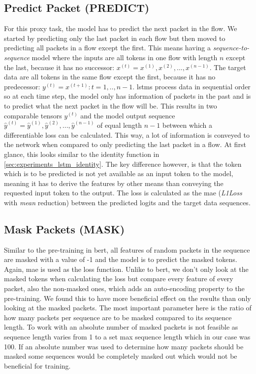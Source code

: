 \subsection{Predict Packet (PREDICT)} \label{sec:experiments:lstm:predict_packet}

For this proxy task, the model has to predict the next packet in the flow. We started by predicting only the last packet in each flow but then moved to predicting all packets in a flow except the first. This means having a \textit{sequence-to-sequence} model where the inputs are all tokens in one flow with length $n$ except the last, because it has no successor: $x^{(t)} = x^{(1)}, x^{(2)}, ..., x^{(n-1)}$. The target data are all tokens in the same flow except the first, because it has no predecessor: $y^{(t)} = x^{(t+1)} : t = 1,..,n-1$. \glspl{lstm} process data in sequential order so at each time step, the model only has information of packets in the past and is to predict what the next packet in the flow will be. This results in two comparable tensors $y^{(t)}$ and the model output sequence $\hat{y}^{(t)} = \hat{y}^{(1)}, \hat{y}^{(2)}, ..., \hat{y}^{(n-1)}$ of equal length $n-1$ between which a differentiable loss can be calculated. This way, a lot of information is conveyed to the network when compared to only predicting the last packet in a flow. At first glance, this looks similar to the identity function in \ref{sec:experiments_lstm_identity}. The key difference however, is that the token which is to be predicted is not yet available as an input token to the model, meaning it has to derive the features by other means than conveying the requested input token to the output. The loss is calculated as the \gls{mae} (\textit{L1Loss} with \textit{mean} reduction) between the predicted logits and the target data sequences.

\subsection{Mask Packets (MASK)} \label{sec:experiments:lstm:mask_packet}

Similar to the pre-training in \gls{bert}, all features of random packets in the sequence are masked with a value of -1 and the model is to predict the masked tokens. Again, \gls{mae} is used as the loss function. Unlike to \gls{bert}, we don't only look at the masked tokens when calculating the loss but compare every feature of every packet, also the non-masked ones, which adds an auto-encoding property to the pre-training. We found this to have more beneficial effect on the results than only looking at the masked packets. The most important parameter here is the ratio of how many packets per sequence are to be masked compared to its sequence length. To work with an absolute number of masked packets is not feasible as sequence length varies from 1 to a set max sequence length which in our case was 100. If an absolute number was used to determine how many packets should be masked some sequences would be completely masked out which would not be beneficial for training.


